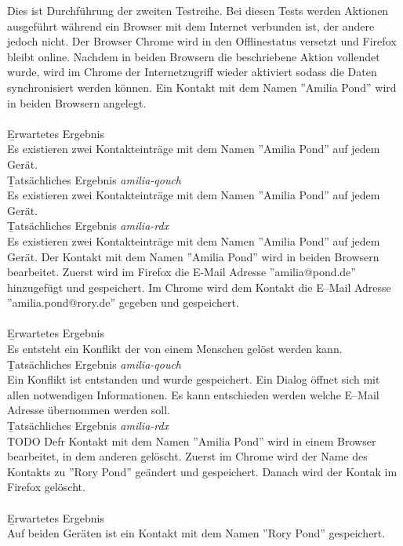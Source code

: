 Dies ist Durchführung der zweiten Testreihe.
Bei diesen Tests werden Aktionen ausgeführt während ein Browser mit dem Internet verbunden ist, der andere jedoch nicht.
Der Browser Chrome wird in den Offlinestatus versetzt und Firefox bleibt online. Nachdem in beiden Browsern die beschriebene Aktion vollendet wurde, wird im Chrome der Internetzugriff wieder aktiviert sodass die Daten synchronisiert werden können. 
% 
Ein Kontakt mit dem Namen ''Amilia Pond'' wird in beiden Browsern angelegt.\\\\
\b{Erwartetes Ergebnis}\\
Es existieren zwei Kontakteinträge mit dem Namen ''Amilia Pond'' auf jedem Gerät.\\
\b{Tatsächliches Ergebnis \it{amilia-qouch}}\\
Es existieren zwei Kontakteinträge mit dem Namen ''Amilia Pond'' auf jedem Gerät.\\
\b{Tatsächliches Ergebnis \it{amilia-rdx}}\\
Es existieren zwei Kontakteinträge mit dem Namen ''Amilia Pond'' auf jedem Gerät.
%
Der Kontakt mit dem Namen ''Amilia Pond'' wird in beiden Browsern bearbeitet.
Zuerst wird im Firefox die E-Mail Adresse ''amilia@pond.de'' hinzugefügt und gespeichert.
Im Chrome wird dem Kontakt die E--Mail Adresse ''amilia.pond@rory.de'' gegeben und gespeichert.\\\\
\b{Erwartetes Ergebnis}\\
Es entsteht ein Konflikt der von einem Menschen gelöst werden kann.\\
\b{Tatsächliches Ergebnis \it{amilia-qouch}}\\
Ein Konflikt ist entstanden und wurde gespeichert. Ein Dialog öffnet sich mit allen notwendigen Informationen.
Es kann entschieden werden welche E--Mail Adresse übernommen werden soll.\\
\b{Tatsächliches Ergebnis \it{amilia-rdx}}\\
TODO
%
%
Defr Kontakt mit dem Namen ''Amilia Pond'' wird in einem Browser bearbeitet, in dem anderen gelöscht.
Zuerst im Chrome wird der Name des Kontakts zu ''Rory Pond'' geändert und gespeichert.
Danach wird der Kontak im Firefox gelöscht.\\\\
\b{Erwartetes Ergebnis}\\
Auf beiden Geräten ist ein Kontakt mit dem Namen ''Rory Pond'' gespeichert.\\

